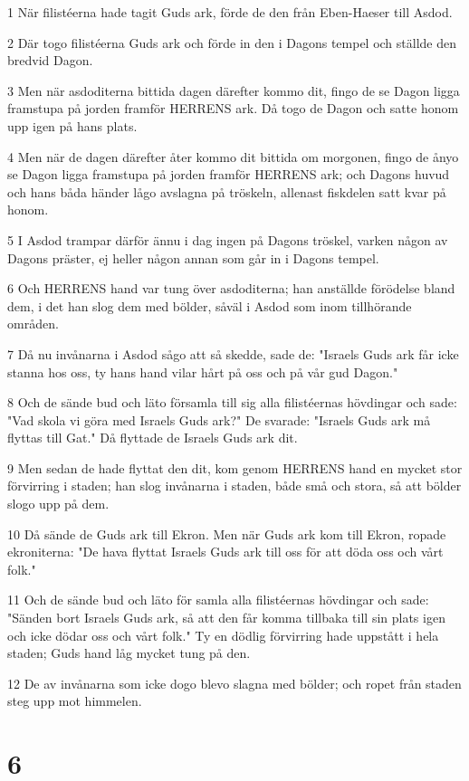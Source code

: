 \par 1 När filistéerna hade tagit Guds ark, förde de den från Eben-Haeser till Asdod.
\par 2 Där togo filistéerna Guds ark och förde in den i Dagons tempel och ställde den bredvid Dagon.
\par 3 Men när asdoditerna bittida dagen därefter kommo dit, fingo de se Dagon ligga framstupa på jorden framför HERRENS ark. Då togo de Dagon och satte honom upp igen på hans plats.
\par 4 Men när de dagen därefter åter kommo dit bittida om morgonen, fingo de ånyo se Dagon ligga framstupa på jorden framför HERRENS ark; och Dagons huvud och hans båda händer lågo avslagna på tröskeln, allenast fiskdelen satt kvar på honom.
\par 5 I Asdod trampar därför ännu i dag ingen på Dagons tröskel, varken någon av Dagons präster, ej heller någon annan som går in i Dagons tempel.
\par 6 Och HERRENS hand var tung över asdoditerna; han anställde förödelse bland dem, i det han slog dem med bölder, såväl i Asdod som inom tillhörande områden.
\par 7 Då nu invånarna i Asdod sågo att så skedde, sade de: "Israels Guds ark får icke stanna hos oss, ty hans hand vilar hårt på oss och på vår gud Dagon."
\par 8 Och de sände bud och läto församla till sig alla filistéernas hövdingar och sade: "Vad skola vi göra med Israels Guds ark?" De svarade: "Israels Guds ark må flyttas till Gat." Då flyttade de Israels Guds ark dit.
\par 9 Men sedan de hade flyttat den dit, kom genom HERRENS hand en mycket stor förvirring i staden; han slog invånarna i staden, både små och stora, så att bölder slogo upp på dem.
\par 10 Då sände de Guds ark till Ekron. Men när Guds ark kom till Ekron, ropade ekroniterna: "De hava flyttat Israels Guds ark till oss för att döda oss och vårt folk."
\par 11 Och de sände bud och läto för samla alla filistéernas hövdingar och sade: "Sänden bort Israels Guds ark, så att den får komma tillbaka till sin plats igen och icke dödar oss och vårt folk." Ty en dödlig förvirring hade uppstått i hela staden; Guds hand låg mycket tung på den.
\par 12 De av invånarna som icke dogo blevo slagna med bölder; och ropet från staden steg upp mot himmelen.

\chapter{6}

